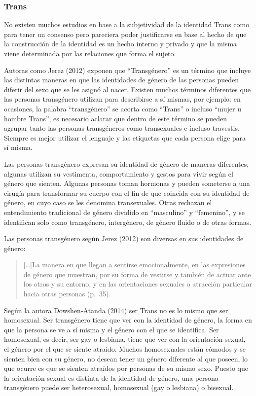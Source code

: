 \subsubsection{Trans}
No existen muchos estudios en base a la subjetividad de la identidad Trans como
para tener un consenso pero pareciera poder justificarse en base al hecho de que
la construcción de la identidad es un hecho interno y privado y que la misma
viene determinada por las relaciones que forma el sujeto.

Autoras como Jerez (2012) exponen que “Transgénero” es un término que incluye
las distintas maneras en que las identidades de género de las personas pueden
diferir del sexo que se les asignó al nacer.
Existen muchos términos diferentes que las personas transgénero utilizan para
describirse a sí mismas, por ejemplo: en ocasiones, la palabra “transgénero” se
acorta como “Trans” o incluso “mujer u  hombre Trans”, es necesario aclarar que
dentro de este término se pueden agrupar tanto las personas transgéneros como
transexuales e incluso travestis.
Siempre es mejor utilizar el lenguaje y las etiquetas que cada persona elige
para sí misma.

Las personas transgénero expresan su identidad de género de maneras diferentes,
algunas utilizan su vestimenta, comportamiento y gestos para vivir según el
género que sienten.
Algunas personas toman hormonas y pueden someterse a una cirugía para
transformar su cuerpo con el fin de que coincida con su identidad de género, en
cuyo caso se les denomina transexuales.
Otras rechazan el entendimiento tradicional de género dividido en “masculino” y
“femenino”, y se identifican solo como transgénero, intergénero, de género
fluido o de otras formas.

Las personas transgénero según Jerez (2012) son diversas en sus identidades de
género:

\begin{quote}
    […]La manera en que llegan a sentirse emocionalmente, en las expresiones de
    género que muestran, por su forma de vestirse y también de actuar ante los
    otros y su entorno, y en las orientaciones sexuales o atracción particular
    hacia otras personas (p.~35).
\end{quote}

Según la autora Dowshen-Atanda (2014) ser Trans no es lo mismo que ser
homosexual.
Ser transgénero tiene que ver con la identidad de género, la forma en que la
persona se ve a sí misma y el género con el que se identifica.
Ser homosexual, es decir, ser gay o lesbiana, tiene que ver con la orientación
sexual, el género por el que se siente atraído.
Muchos homosexuales están cómodos y se sienten bien con su género, no desean
tener un género diferente al que poseen, lo que ocurre es que se sienten
atraídos por personas de su mismo sexo.
Puesto que la orientación sexual es distinta de la identidad de género, una
persona transgénero puede ser heterosexual, homosexual (gay o lesbiana) o
bisexual.

